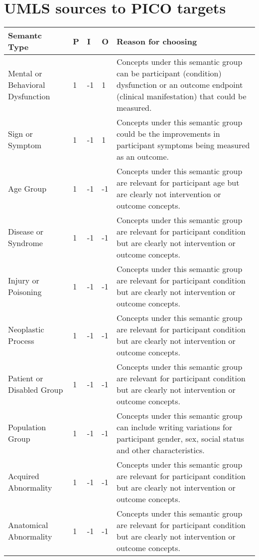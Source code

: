 \documentclass[10.7pt,]{article}
\begin{document}
\section{UMLS sources to PICO targets}\label{lss}
%
\begin{longtable}{|l|p{0.3cm}|p{0.3cm}|p{0.3cm}|p{7.9cm}|}
    \hline
        Semantc Type & P & I & O & Reason for choosing \\ \hline
        Mental or Behavioral Dysfunction & 1 & -1 & 1 & Concepts under this semantic group can be participant (condition) dysfunction or an outcome endpoint (clinical manifestation) that could be measured. \\ \hline
        Sign or Symptom & 1 & -1 & 1 & Concepts under this semantic group could be the improvements in participant symptoms being measured as an outcome. \\ \hline
        Age Group & 1 & -1 & -1 & Concepts under this semantic group are relevant for participant age but are clearly not intervention or outcome concepts. \\ \hline
        Disease or Syndrome & 1 & -1 & -1 & Concepts under this semantic group are relevant for participant condition but are clearly not intervention or outcome concepts. \\ \hline
        Injury or Poisoning & 1 & -1 & -1 & Concepts under this semantic group are relevant for participant condition but are clearly not intervention or outcome concepts. \\ \hline
        Neoplastic Process & 1 & -1 & -1 & Concepts under this semantic group are relevant for participant condition but are clearly not intervention or outcome concepts. \\ \hline
        Patient or Disabled Group & 1 & -1 & -1 & Concepts under this semantic group are relevant for participant condition but are clearly not intervention or outcome concepts. \\ \hline
        Population Group & 1 & -1 & -1 & Concepts under this semantic group can include writing variations for participant gender, sex, social status and other characteristics. \\ \hline
        Acquired Abnormality & 1 & -1 & -1 & Concepts under this semantic group are relevant for participant condition but are clearly not intervention or outcome concepts. \\ \hline
        Anatomical Abnormality & 1 & -1 & -1 & Concepts under this semantic group are relevant for participant condition but are clearly not intervention or outcome concepts. \\ \hline

\end{longtable}
\end{document}
